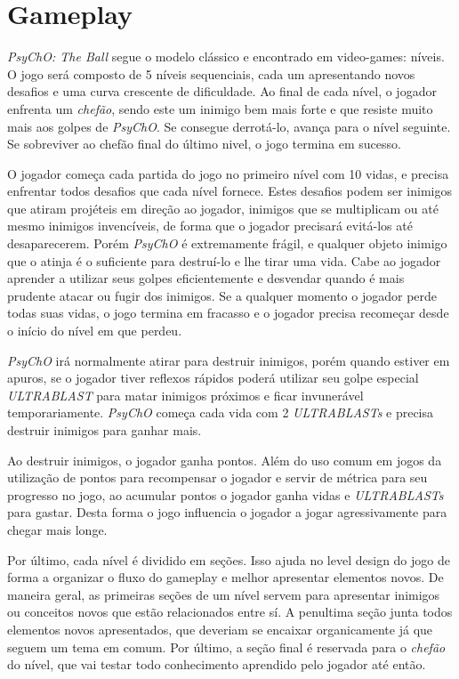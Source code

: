 \section{Gameplay}
\label{sec:gameplay}

\textit{PsyChO: The Ball} segue o modelo clássico e encontrado em video-games: níveis. O jogo será composto de 5 níveis sequenciais, cada um apresentando novos desafios e
uma curva crescente de dificuldade. Ao final de cada nível, o jogador enfrenta um \textit{chefão}, sendo este um inimigo bem mais forte e que resiste muito mais aos
golpes de \textit{PsyChO}. Se consegue derrotá-lo, avança para o nível seguinte. Se sobreviver ao chefão final do último nivel, o jogo termina em sucesso.

O jogador começa cada partida do jogo no primeiro nível com 10 vidas, e precisa enfrentar todos desafios que cada nível fornece. Estes desafios podem ser
inimigos que atiram projéteis em direção ao jogador, inimigos que se multiplicam ou até mesmo inimigos invencíveis, de forma que o jogador precisará evitá-los até desaparecerem.
Porém \textit{PsyChO} é extremamente frágil, e qualquer objeto inimigo que o atinja é o suficiente para destruí-lo e lhe tirar uma vida. Cabe ao jogador aprender
a utilizar seus golpes eficientemente e desvendar quando é mais prudente atacar ou fugir dos inimigos. Se a qualquer momento o jogador perde todas suas vidas,
o jogo termina em fracasso e o jogador precisa recomeçar desde o início do nível em que perdeu.

\textit{PsyChO} irá normalmente atirar para destruir inimigos, porém quando estiver em apuros, se o jogador tiver reflexos rápidos poderá utilizar seu golpe especial \textit{ULTRABLAST} para matar inimigos próximos e ficar invunerável temporariamente. \textit{PsyChO} começa cada vida com 2 \textit{ULTRABLASTs} e precisa destruir inimigos
para ganhar mais.

Ao destruir inimigos, o jogador ganha pontos. Além do uso comum em jogos da utilização de pontos para recompensar o jogador e servir de métrica para seu progresso no jogo,
ao acumular pontos o jogador ganha vidas e \textit{ULTRABLASTs} para gastar. Desta forma o jogo influencia o jogador a jogar agressivamente para chegar mais longe.

Por último, cada nível é dividido em seções. Isso ajuda no level design do jogo de forma a organizar o fluxo do gameplay e melhor apresentar elementos novos. De maneira geral, as primeiras seções de um nível servem para apresentar inimigos ou conceitos novos que estão relacionados entre sí. A penultima seção junta todos elementos novos apresentados, que deveriam se encaixar organicamente já que seguem um tema em comum. Por último, a seção final é reservada para o \textit{chefão} do nível, que vai testar todo conhecimento aprendido pelo jogador até então.

